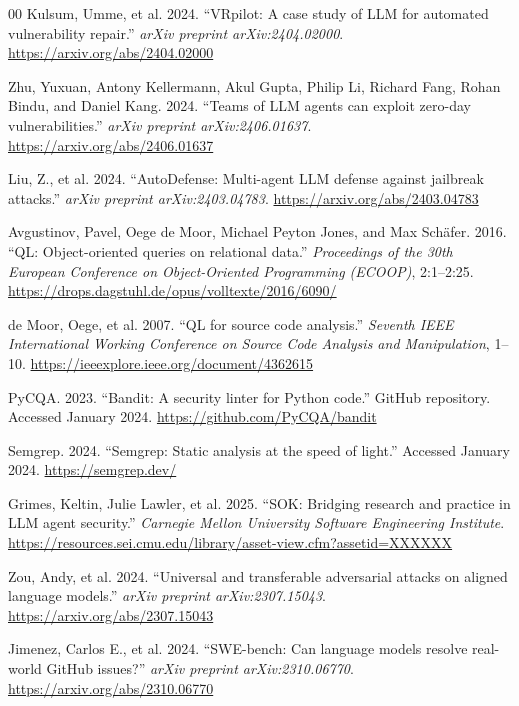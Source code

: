 \documentclass[conference]{IEEEtran}
\begin{document}
\begin{thebibliography}{00}
Kulsum, Umme, et al. 2024. ``VRpilot: A case study of LLM for automated vulnerability repair.'' \textit{arXiv preprint arXiv:2404.02000}. \url{https://arxiv.org/abs/2404.02000}

Zhu, Yuxuan, Antony Kellermann, Akul Gupta, Philip Li, Richard Fang, Rohan Bindu, and Daniel Kang. 2024. ``Teams of LLM agents can exploit zero-day vulnerabilities.'' \textit{arXiv preprint arXiv:2406.01637}. \url{https://arxiv.org/abs/2406.01637}

Liu, Z., et al. 2024. ``AutoDefense: Multi-agent LLM defense against jailbreak attacks.'' \textit{arXiv preprint arXiv:2403.04783}. \url{https://arxiv.org/abs/2403.04783}

Avgustinov, Pavel, Oege de Moor, Michael Peyton Jones, and Max Schäfer. 2016. ``QL: Object-oriented queries on relational data.'' \textit{Proceedings of the 30th European Conference on Object-Oriented Programming (ECOOP)}, 2:1--2:25. \url{https://drops.dagstuhl.de/opus/volltexte/2016/6090/}

de Moor, Oege, et al. 2007. ``QL for source code analysis.'' \textit{Seventh IEEE International Working Conference on Source Code Analysis and Manipulation}, 1--10. \url{https://ieeexplore.ieee.org/document/4362615}

PyCQA. 2023. ``Bandit: A security linter for Python code.'' GitHub repository. Accessed January 2024. \url{https://github.com/PyCQA/bandit}

Semgrep. 2024. ``Semgrep: Static analysis at the speed of light.'' Accessed January 2024. \url{https://semgrep.dev/}

Grimes, Keltin, Julie Lawler, et al. 2025. ``SOK: Bridging research and practice in LLM agent security.'' \textit{Carnegie Mellon University Software Engineering Institute}. \url{https://resources.sei.cmu.edu/library/asset-view.cfm?assetid=XXXXXX}

Zou, Andy, et al. 2024. ``Universal and transferable adversarial attacks on aligned language models.'' \textit{arXiv preprint arXiv:2307.15043}. \url{https://arxiv.org/abs/2307.15043}

Jimenez, Carlos E., et al. 2024. ``SWE-bench: Can language models resolve real-world GitHub issues?'' \textit{arXiv preprint arXiv:2310.06770}. \url{https://arxiv.org/abs/2310.06770}


\end{thebibliography}
\end{document}
